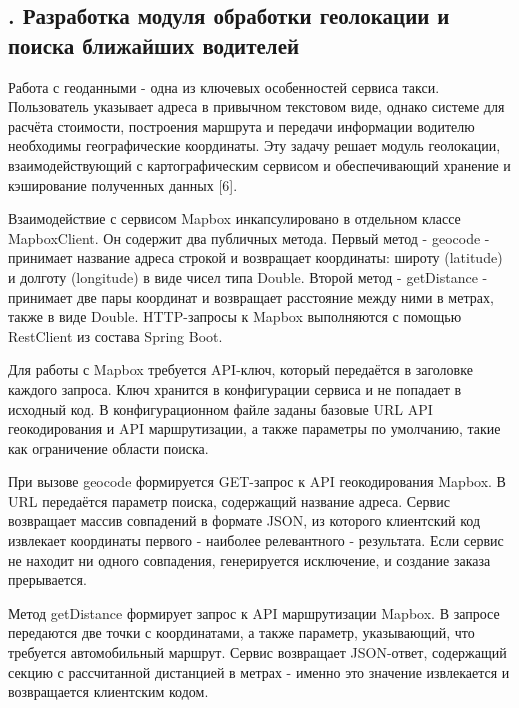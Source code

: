 \subtitlespace

\subsection*{
  \gostTitleFont
  \redline
  \thechaptercntr .\thesubchaptercntr \spc
  Разработка модуля обработки геолокации и поиска ближайших водителей
} \addtocounter{subchaptercntr}{1}

\subtitlespace

{\gostFont

  \par \redline Работа с геоданными - одна из ключевых особенностей сервиса такси. Пользователь указывает адреса в привычном текстовом виде, однако системе для расчёта стоимости, построения маршрута и передачи информации водителю необходимы географические координаты. Эту задачу решает модуль геолокации, взаимодействующий с картографическим сервисом и обеспечивающий хранение и кэширование полученных данных [6].

  \par \redline Взаимодействие с сервисом Mapbox инкапсулировано в отдельном классе \\MapboxClient. Он содержит два публичных метода. Первый метод - geocode - принимает название адреса строкой и возвращает координаты: широту (latitude) и долготу (longitude) в виде чисел типа Double. Второй метод - getDistance - принимает две пары координат и возвращает расстояние между ними в метрах, также в виде Double. HTTP-запросы к Mapbox выполняются с помощью RestClient из состава Spring Boot.

  \par \redline Для работы с Mapbox требуется API-ключ, который передаётся в заголовке каждого запроса. Ключ хранится в конфигурации сервиса и не попадает в исходный код. В конфигурационном файле заданы базовые URL API геокодирования и API маршрутизации, а также параметры по умолчанию, такие как ограничение области поиска.

  \par \redline При вызове geocode формируется GET-запрос к API геокодирования Mapbox. В URL передаётся параметр поиска, содержащий название адреса. Сервис возвращает массив совпадений в формате JSON, из которого клиентский код извлекает координаты первого - наиболее релевантного - результата. Если сервис не находит ни одного совпадения, генерируется исключение, и создание заказа прерывается.

  \par \redline Метод getDistance формирует запрос к API маршрутизации Mapbox. В запросе передаются две точки с координатами, а также параметр, указывающий, что требуется автомобильный маршрут. Сервис возвращает JSON-ответ, содержащий секцию с рассчитанной дистанцией в метрах - именно это значение извлекается и возвращается клиентским кодом.

}
